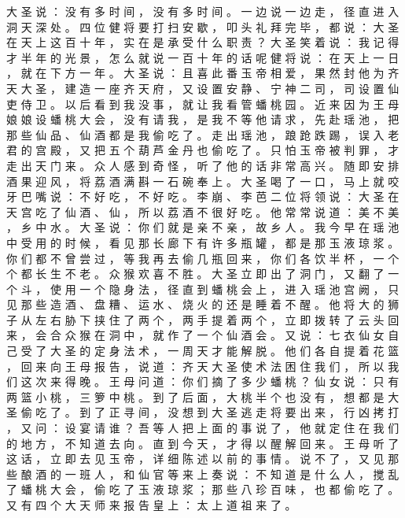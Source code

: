 {大 圣 说 ： 没 有 多 时 间 ， 没 有 多 时 间 。
一 边 说 一 边 走 ， 径 直 进 入 洞 天 深 处 。
四 位 健 将 要 打 扫 安 歇 ， 叩 头 礼 拜 完 毕 ， 都 说 ： 大 圣 在 天 上 这 百 十 年 ， 实 在 是 承 受 什 么 职 责 ？ 大 圣 笑 着 说 ： 我 记 得 才 半 年 的 光 景 ， 怎 么 就 说 一 百 十 年 的 话 呢 健 将 说 ： 在 天 上 一 日 ， 就 在 下 方 一 年 。
大 圣 说 ： 且 喜 此 番 玉 帝 相 爱 ， 果 然 封 他 为 齐 天 大 圣 ， 建 造 一 座 齐 天 府 ， 又 设 置 安 静 、 宁 神 二 司 ， 司 设 置 仙 吏 侍 卫 。
以 后 看 到 我 没 事 ， 就 让 我 看 管 蟠 桃 园 。
近 来 因 为 王 母 娘 娘 设 蟠 桃 大 会 ， 没 有 请 我 ， 是 我 不 等 他 请 求 ， 先 赴 瑶 池 ， 把 那 些 仙 品 、 仙 酒 都 是 我 偷 吃 了 。
走 出 瑶 池 ， 踉 跄 跌 踢 ， 误 入 老 君 的 宫 殿 ， 又 把 五 个 葫 芦 金 丹 也 偷 吃 了 。
只 怕 玉 帝 被 判 罪 ， 才 走 出 天 门 来 。
众 人 感 到 奇 怪 ， 听 了 他 的 话 非 常 高 兴 。
随 即 安 排 酒 果 迎 风 ， 将 荔 酒 满 斟 一 石 碗 奉 上 。
大 圣 喝 了 一 口 ， 马 上 就 咬 牙 巴 嘴 说 ： 不 好 吃 ， 不 好 吃 。
李 崩 、 李 芭 二 位 将 领 说 ： 大 圣 在 天 宫 吃 了 仙 酒 、 仙 ， 所 以 荔 酒 不 很 好 吃 。
他 常 常 说 道 ： 美 不 美 ， 乡 中 水 。
大 圣 说 ： 你 们 就 是 亲 不 亲 ， 故 乡 人 。
我 今 早 在 瑶 池 中 受 用 的 时 候 ， 看 见 那 长 廊 下 有 许 多 瓶 罐 ， 都 是 那 玉 液 琼 浆 。
你 们 都 不 曾 尝 过 ， 等 我 再 去 偷 几 瓶 回 来 ， 你 们 各 饮 半 杯 ， 一 个 个 都 长 生 不 老 。
众 猴 欢 喜 不 胜 。
大 圣 立 即 出 了 洞 门 ， 又 翻 了 一 个 斗 ， 使 用 一 个 隐 身 法 ， 径 直 到 蟠 桃 会 上 ， 进 入 瑶 池 宫 阙 ， 只 见 那 些 造 酒 、 盘 糟 、 运 水 、 烧 火 的 还 是 睡 着 不 醒 。
他 将 大 的 狮 子 从 左 右 胁 下 挟 住 了 两 个 ， 两 手 提 着 两 个 ， 立 即 拨 转 了 云 头 回 来 ， 会 合 众 猴 在 洞 中 ， 就 作 了 一 个 仙 酒 会 。
又 说 ： 七 衣 仙 女 自 己 受 了 大 圣 的 定 身 法 术 ， 一 周 天 才 能 解 脱 。
他 们 各 自 提 着 花 篮 ， 回 来 向 王 母 报 告 ， 说 道 ： 齐 天 大 圣 使 术 法 困 住 我 们 ， 所 以 我 们 这 次 来 得 晚 。
王 母 问 道 ： 你 们 摘 了 多 少 蟠 桃 ？ 仙 女 说 ： 只 有 两 篮 小 桃 ， 三 箩 中 桃 。
到 了 后 面 ， 大 桃 半 个 也 没 有 ， 想 都 是 大 圣 偷 吃 了 。
到 了 正 寻 间 ， 没 想 到 大 圣 逃 走 将 要 出 来 ， 行 凶 拷 打 ， 又 问 ： 设 宴 请 谁 ？
吾 等 人 把 上 面 的 事 说 了 ， 他 就 定 住 在 我 们 的 地 方 ， 不 知 道 去 向 。
直 到 今 天 ， 才 得 以 醒 解 回 来 。
王 母 听 了 这 话 ， 立 即 去 见 玉 帝 ， 详 细 陈 述 以 前 的 事 情 。
说 不 了 ， 又 见 那 些 酿 酒 的 一 班 人 ， 和 仙 官 等 来 上 奏 说 ： 不 知 道 是 什 么 人 ， 搅 乱 了 蟠 桃 大 会 ， 偷 吃 了 玉 液 琼 浆 ； 那 些 八 珍 百 味 ， 也 都 偷 吃 了 。
又 有 四 个 大 天 师 来 报 告 皇 上 ： 太 上 道 祖 来 了 。
}
